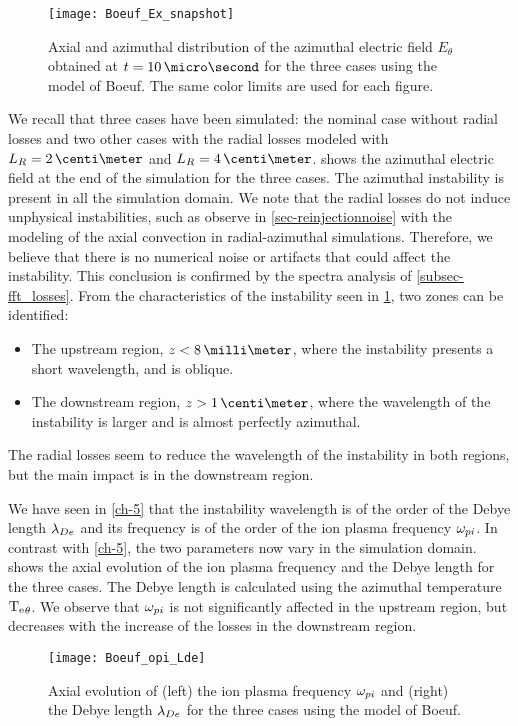   \begin{figure}[hbt]
    \centering
    \texttt{[image: Boeuf\_Ex\_snapshot]}
    \caption{Axial and azimuthal distribution of the azimuthal electric field $E_{\theta}$  obtained at $t=10 \,\micro\second$ for the three cases using the model of Boeuf. The same color limits are used for each figure.}
    \label{fig-snapshots}
  \end{figure}
  We recall that three cases have been simulated\string: the nominal case without radial losses and two other cases with the radial losses modeled with $L_R=2\,\centi\meter$ and $L_R=4\,\centi\meter$.
   shows the azimuthal electric field at the end of the simulation for the three cases.
  The azimuthal instability is present in all the simulation domain.
  We note that the radial losses do not induce unphysical instabilities, such as observe in \cref{sec-reinjectionnoise} with the modeling of the axial convection in radial-azimuthal simulations.
  Therefore, we believe that there is no numerical noise or artifacts that could affect the instability.
  This conclusion is confirmed by the spectra analysis of \cref{subsec-fft_losses}.
  From the characteristics of the instability seen in \cref{fig-snapshots}, two zones can be identified\string:
  \begin{itemize}
    \item The upstream region, $z < 8 \,\milli\meter$, where the instability presents a short wavelength, and is oblique.
    \item The downstream region, $z > 1\,\centi\meter$, where the wavelength of the instability is larger and is almost perfectly azimuthal.
  \end{itemize}
  The radial losses seem to reduce the wavelength of the instability in both regions, but the main impact is in the downstream region.


  We have seen in \cref{ch-5} that the instability wavelength is of the order of the Debye length $\lambda_{De}$ and its frequency is of the order of the ion plasma frequency $\omega_{pi}$.
  In contrast with \cref{ch-5}, the two parameters now vary in the simulation domain.
   shows the axial evolution of the ion plasma frequency and the Debye length for the three cases.
  The Debye length is calculated using the azimuthal temperature $\mathrm{T_e}_{\theta}$.
  We observe that $\omega_{pi}$ is not significantly affected in the upstream region, but decreases with the increase of the losses in the downstream region.

  \begin{figure}[hbt]
    \centering
    \texttt{[image: Boeuf\_opi\_Lde]}
    \caption{Axial evolution of (left) the ion plasma frequency $\omega_{pi}$ and (right) the Debye length $\lambda_{De}$ for the three cases using the model of Boeuf.}
    \label{fig-wpi_Lde}
  \end{figure}


